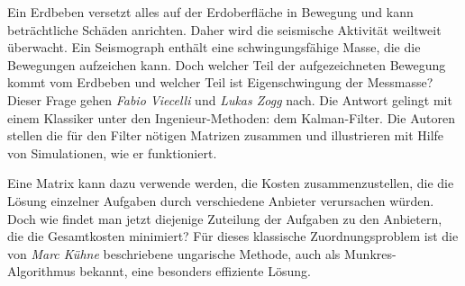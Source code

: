 Ein Erdbeben versetzt alles auf der Erdoberfläche in Bewegung und
kann beträchtliche Schäden anrichten.
Daher wird die seismische Aktivität weiltweit überwacht.
Ein Seismograph enthält eine schwingungsfähige Masse, die die Bewegungen
aufzeichen kann.
Doch welcher Teil der aufgezeichneten Bewegung kommt vom Erdbeben
und welcher Teil ist Eigenschwingung der Messmasse?
Dieser Frage gehen {\em Fabio Viecelli} und {\em Lukas Zogg} nach.
%
%
Die Antwort gelingt mit einem Klassiker unter den Ingenieur-Methoden:
dem Kalman-Filter.
Die Autoren stellen die für den Filter nötigen Matrizen zusammen
und illustrieren mit Hilfe von Simulationen, wie er funktioniert.

Eine Matrix kann dazu verwende werden, die Kosten zusammenzustellen,
die die Lösung einzelner Aufgaben durch verschiedene Anbieter
verursachen würden.
Doch wie findet man jetzt diejenige Zuteilung der Aufgaben
zu den Anbietern, die die Gesamtkosten minimiert?
Für dieses klassische Zuordnungsproblem ist die
von {\em Marc Kühne} beschriebene ungarische Methode,
%
auch als Munkres-Algorithmus bekannt, eine besonders effiziente
Lösung.



